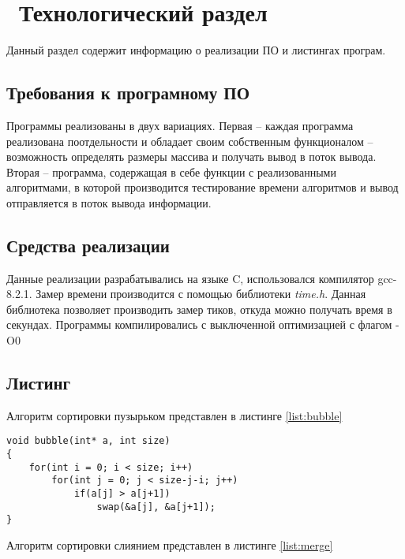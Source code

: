 \chapter{ Технологический раздел}
\label{cha:impl}

Данный раздел содержит информацию о реализации ПО и листингах програм.

\section{ Требования к програмному ПО}
Программы реализованы в двух вариациях. Первая -- каждая программа реализована поотдельности и обладает своим собственным функционалом -- возможность определять размеры массива и получать вывод в поток вывода. Вторая -- программа, содержащая в себе функции с реализованными алгоритмами, в которой производится тестирование времени алгоритмов и вывод отправляется в поток вывода информации.

\section{ Средства реализации }
Данные реализации разрабатывались на языке C, использовался компилятор gcc-8.2.1.
Замер времени производится с помощью библиотеки \textit{time.h}. Данная библиотека позволяет производить замер тиков, откуда можно получать время в секундах. 
Программы компилировались с выключенной оптимизацией с флагом -O0

\section{ Листинг}
Алгоритм сортировки пузырьком представлен в листинге \ref{list:bubble}

\begin{lstlisting}[style=CStyle, caption={bubble sort},
                    label={list:bubble}]
void bubble(int* a, int size)
{
    for(int i = 0; i < size; i++)
        for(int j = 0; j < size-j-i; j++)
            if(a[j] > a[j+1])
                swap(&a[j], &a[j+1]);
}
\end{lstlisting}

Алгоритм сортировки слиянием представлен в листинге \ref{list:merge}

